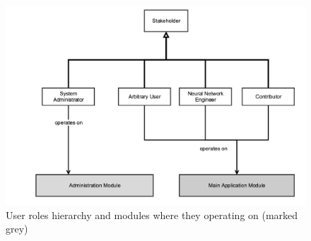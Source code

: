 \begin{figure}[htbp]
\begin{center}
  \includegraphics[width=\linewidth]{components/4/pics/users.png}
  \caption{User roles hierarchy and modules where they operating on (marked grey)}
  \label{fig:userroles}
\end{center}
\end{figure}


